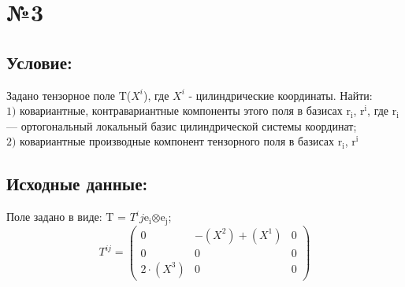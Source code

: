 \documentclass{article}
\begin{document}
\vspace*{-0cm} %

\section*{№3}
\subsection*{Условие:}
Задано тензорное поле $\mathrm{T}$($X^i$), где $X^i$ - цилиндрические координаты. Найти:\\
$\mathrm{1)}$ ковариантные, контравариантные компоненты этого поля в базисах $\mathrm{r_i}$, $\mathrm{r^i}$,
где $\mathrm{r_i}$ — ортогональный локальный базис цилиндрической системы координат;\\
$\mathrm{2)}$ ковариантные производные компонент тензорного поля в базисах $\mathrm{r_i}$, $\mathrm{r^i}$\\
\subsection*{Исходные данные:}
Поле задано в виде: $\mathrm{T}$ = $T^ij$$\mathrm{e_i}$$\otimes$$\mathrm{e_j}$;\\

\[
T^{ij}=\begin{pmatrix}
	0 & -(X^2) + (X^1) & 0\\
	0 & 0 & 0\\
	2\cdot (X^3) & 0 & 0
\end{pmatrix}
\]
\end{document}
